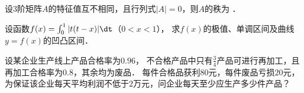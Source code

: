 \documentclass[plain,noanswer,medmath]{../../template/jnuexam}
\begin{document}


\begin{problem}
设$3$阶矩阵$A$的特征值互不相同，且行列式$|A| = 0$，则$A$的秩为 \fillin{}．
\end{problem}








\begin{problem}[points=10]
设函数$f(x) = \int_0^1 |t(t - x)|\dt$（$0 < x < 1$），
求$f(x)$的极值、单调区间及曲线$y = f(x)$的凹凸区间．
\end{problem}














\begin{problem}[points=11]
设某企业生产线上产品合格率为$0.96$，
不合格产品中只有$\frac{3}{4}$产品可进行再加工，且再加工合格率为$0.8$，其余均为废品．
每件合格品获利$80$元，每件废品亏损$20$元，
为保证该企业每天平均利润不低于$2$万元，问企业每天至少应生产多少件产品？
\end{problem}
\end{document}
